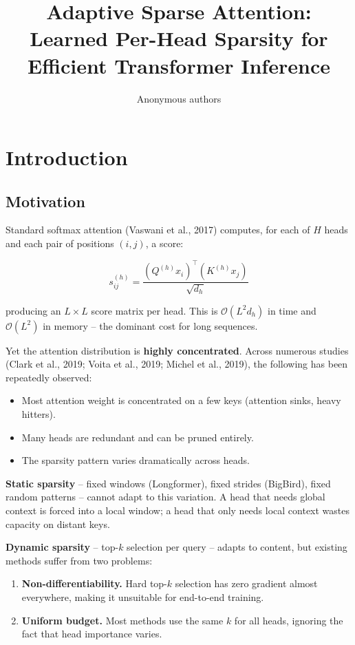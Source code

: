 \title{\textbf{Adaptive Sparse Attention: Learned Per-Head Sparsity for Efficient Transformer Inference}}

\author{Anonymous authors}



\section{Introduction}

\subsection{Motivation}

Standard softmax attention (Vaswani et al., 2017) computes, for each of $H$ 
heads and each pair of positions $(i, j)$, a score:

\[
s_{ij}^{(h)} = \frac{(Q^{(h)} x_i)^\top (K^{(h)} x_j)}{\sqrt{d_h}}
\]

producing an $L \times L$ score matrix per head. This is $\mathcal{O}(L^2 d_h)$ 
in time and $\mathcal{O}(L^2)$ in memory -- the dominant cost for long sequences.

Yet the attention distribution is \textbf{highly concentrated}. Across numerous 
studies (Clark et al., 2019; Voita et al., 2019; Michel et al., 2019), the 
following has been repeatedly observed:

\begin{itemize}
\item Most attention weight is concentrated on a few keys (attention sinks,
  heavy hitters).
\item Many heads are redundant and can be pruned entirely.
\item The sparsity pattern varies dramatically across heads.

\end{itemize}
\textbf{Static sparsity} -- fixed windows (Longformer), fixed strides (BigBird), 
fixed random patterns -- cannot adapt to this variation. A head that needs 
global context is forced into a local window; a head that only needs local 
context wastes capacity on distant keys.

\textbf{Dynamic sparsity} -- top-$k$ selection per query -- adapts to content, but 
existing methods suffer from two problems:

\begin{enumerate}
\item \textbf{Non-differentiability.} Hard top-$k$ selection has zero gradient
  almost everywhere, making it unsuitable for end-to-end training.
\item \textbf{Uniform budget.} Most methods use the same $k$ for all heads, ignoring
  the fact that head importance varies.

\end{enumerate}
